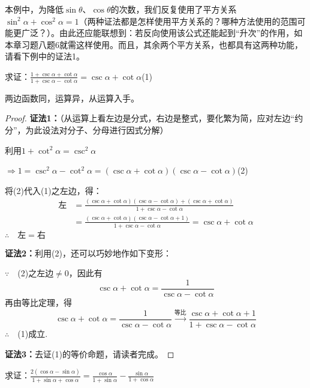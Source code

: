 \begin{remark}
本例中，为降低$\sin\theta$、$\cos\theta$的次数，我们反复使用了平方关系$\sin^2\alpha+\cos^2\alpha=1$（两种证法都是怎样使用平方关系的？哪种方法使用的范围可能更广泛？）。由此还应能联想到：若反向使用该公式还能起到“升次”的作用，如本章习题八题6就需这样使用。而且，其余两个平方关系，也都具有这两种功能，请看下例中的证法1。
\end{remark}

\begin{example}
求证：$\frac{1+\csc\alpha+\cot\alpha}{1+\csc\alpha-\cot\alpha}=\csc\alpha+\cot\alpha$\hfill (1)
\end{example}

\begin{analyze}
    两边函数同，运算异，从运算入手。
\end{analyze}

\begin{proof}
\textbf{证法1：}（从运算上看左边是分式，右边是整式，要化繁为简，应对左边“约分”，为此设法对分子、分母进行因式分解）

利用$1+\cot^2\alpha=\csc^2\alpha$

$\Rightarrow 1=\csc^2\alpha-\cot^2\alpha=(\csc\alpha+\cot\alpha)(\csc\alpha-\cot\alpha)$\hfill (2)

将(2)代入(1)之左边，得：
\[\begin{split}
    \text{左}&=\frac{(\csc\alpha+\cot\alpha)(\csc\alpha-\cot\alpha)+(\csc\alpha+\cot\alpha)}{1+\csc\alpha-\cot\alpha}\\
    &=\frac{(\csc\alpha+\cot\alpha)(\csc\alpha-\cot\alpha+1)}{1+\csc\alpha-\cot\alpha}=\csc\alpha+\cot\alpha
\end{split}\]
$\therefore\quad \text{左}=\text{右}$

\textbf{证法2：}利用(2)，还可以巧妙地作如下变形：

$\because\quad $(2)之左边$\ne 0$，因此有
\[\csc\alpha+\cot\alpha=\frac{1}{\csc\alpha-\cot\alpha}\]
再由等比定理，得
\[\csc\alpha+\cot\alpha=\frac{1}{\csc\alpha-\cot\alpha}\xrightarrow[]{\text{等比}} \frac{\csc\alpha+\cot\alpha+1}{1+\csc\alpha-\cot\alpha} \]
$\therefore\quad$(1)成立.


\textbf{证法3：}去证(1)的等价命题，请读者完成。
\end{proof}

\begin{example}
求证：$\frac{2(\cos\alpha-\sin\alpha)}{1+\sin\alpha+\cos\alpha}=\frac{\cos\alpha}{1+\sin\alpha}-\frac{\sin\alpha}{1+\cos\alpha}$
\end{example}

